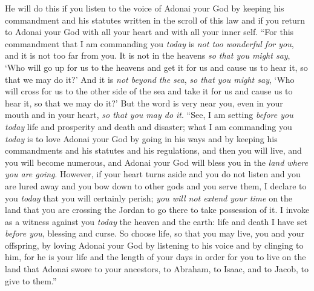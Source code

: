 \begin{biblechapter}
\verse He will do this if you listen to the voice of Adonai your God by keeping his commandment and his statutes written in the scroll of this law and if you return to Adonai your God with all your heart and with all your inner self.
\verse “For this commandment that I am commanding you \textit{today} is \textit{not too wonderful for you}, and it is not too far from you.
\verse It is not in the heavens \textit{so that you might say}, ‘Who will go up for us to the heavens and get it for us and cause us to hear it, so that we may do it?’
\verse And it is \textit{not beyond the sea}, \textit{so that you might say}, ‘Who will cross for us to the other side of the sea and take it for us and cause us to hear it, so that we may do it?’
\verse But the word is very near you, even in your mouth and in your heart, \textit{so that you may do it}.
\verse “See, I am setting \textit{before you} \textit{today} life and prosperity and death and disaster;
\verse what I am commanding you \textit{today} is to love Adonai your God by going in his ways and by keeping his commandments and his statutes and his regulations, and then you will live, and you will become numerous, and Adonai your God will bless you in the \textit{land where you are going}.
\verse However, if your heart turns aside and you do not listen and you are lured away and you bow down to other gods and you serve them,
\verse I declare to you \textit{today} that you will certainly perish; \textit{you will not extend your time} on the land that you are crossing the Jordan to go there to take possession of it.
\verse I invoke as a witness against you \textit{today} the heaven and the earth: life and death I have set \textit{before you}, blessing and curse. So choose life, so that you may live, you and your offspring,
\verse by loving Adonai your God by listening to his voice and by clinging to him, for he is your life and the length of your days in order for you to live on the land that Adonai swore to your ancestors, to Abraham, to Isaac, and to Jacob, to give to them.”
\end{biblechapter}

